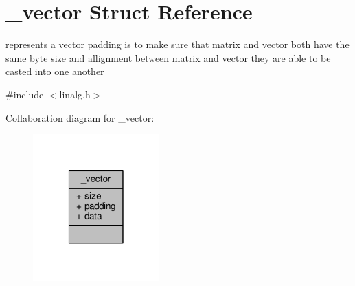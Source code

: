 \hypertarget{struct__vector}{\section{\-\_\-vector Struct Reference}
\label{struct__vector}
}


represents a vector padding is to make sure that matrix and vector both have the same byte size and allignment between matrix and vector they are able to be casted into one another  




{\ttfamily \#include $<$linalg.\-h$>$}



Collaboration diagram for \-\_\-vector\-:
\nopagebreak
\begin{figure}[H]
\begin{center}
\leavevmode
\includegraphics[width=138pt]{struct__vector__coll__graph}
\end{center}
\end{figure}
